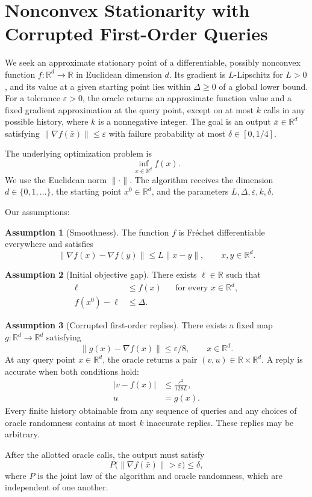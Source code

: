 \documentclass[10pt]{article}
\theoremstyle{definition}
\newtheorem{assumption}{Assumption}
\begin{document}
\section*{Nonconvex Stationarity with Corrupted First-Order Queries}
We seek an approximate stationary point of a differentiable, possibly nonconvex function $f:\mathbb{R}^d\to\mathbb{R}$ in Euclidean dimension $d$. Its gradient is $L$-Lipschitz for $L>0$, and its value at a given starting point lies within $\Delta\geq 0$ of a global lower bound. For a tolerance $\varepsilon>0$, the oracle returns an approximate function value and a fixed gradient approximation at the query point, except on at most $k$ calls in any possible history, where $k$ is a nonnegative integer. The goal is an output $\bar{x}\in\mathbb{R}^d$ satisfying $\|\nabla f(\bar{x})\|\leq\varepsilon$ with failure probability at most $\delta\in[0,1/4]$.

The underlying optimization problem is
\[
\inf_{x\in\mathbb{R}^d} f(x).
\]
We use the Euclidean norm $\|\cdot\|$. The algorithm receives the dimension $d\in\{0,1,\ldots\}$, the starting point $x^0\in\mathbb{R}^d$, and the parameters $L,\Delta,\varepsilon,k,\delta$.

Our assumptions:
\begin{assumption}[Smoothness]
The function $f$ is Fr\'echet differentiable everywhere and satisfies
\[
\|\nabla f(x)-\nabla f(y)\|\leq L\|x-y\|,
\qquad x,y\in\mathbb{R}^d.
\]
\end{assumption}

\begin{assumption}[Initial objective gap]
There exists $\ell\in\mathbb{R}$ such that
\[
\begin{aligned}
\ell &\leq f(x) &&\text{for every }x\in\mathbb{R}^d,\\
f(x^0)-\ell &\leq \Delta.
\end{aligned}
\]
\end{assumption}

\begin{assumption}[Corrupted first-order replies]
There exists a fixed map $g:\mathbb{R}^d\to\mathbb{R}^d$ satisfying
\[
\|g(x)-\nabla f(x)\|\leq \varepsilon/8,
\qquad x\in\mathbb{R}^d.
\]
At any query point $x\in\mathbb{R}^d$, the oracle returns a pair $(v,u)\in\mathbb{R}\times\mathbb{R}^d$. A reply is accurate when both conditions hold:
\[
\begin{aligned}
|v-f(x)| &\leq \frac{\varepsilon^2}{128L},\\
u &= g(x).
\end{aligned}
\]
Every finite history obtainable from any sequence of queries and any choices of oracle randomness contains at most $k$ inaccurate replies. These replies may be arbitrary.
\end{assumption}

After the allotted oracle calls, the output must satisfy
\[
P\bigl(\|\nabla f(\bar{x})\|>\varepsilon\bigr)\leq\delta,
\]
where $P$ is the joint law of the algorithm and oracle randomness, which are independent of one another.
\end{document}
